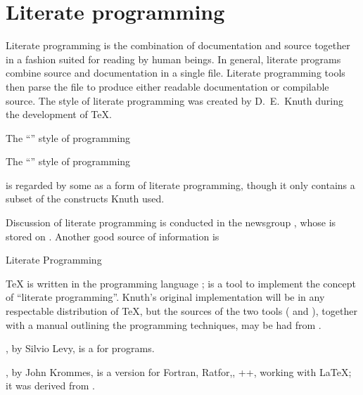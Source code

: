
\section{Literate programming}


Literate programming is the combination of documentation and source
together in a fashion suited for reading by human beings. 
In general, literate programs combine source
and documentation in a single file.  Literate programming tools then
parse the file to produce either readable documentation or compilable
source.  The  style of literate programming was created by
D.~E.~Knuth during the development of \TeX{}.

\htmlignore
The ``'' style of programming
\endhtmlignore
\begin{htmlversion}
  The ``'' style of programming
\end{htmlversion}
is regarded by some as a form of literate programming, though it only
contains a subset of the constructs Knuth used.

Discussion of literate programming is conducted in the newsgroup
, whose  is stored on
.  Another good source of information is
\begin{ctanrefs}
\item[\nothtml{\rmfamily}Literate Programming \acro{FAQ}]%
\end{ctanrefs}


\TeX{} is written in the programming language ; 
is a tool to implement the concept of ``literate programming''.
Knuth's original implementation will be in any respectable
distribution of \TeX{}, but the sources of the two tools
( and ), together with a manual
outlining the programming techniques, may be had from .

, by Silvio Levy, is a  for  programs.

, by John Krommes, is a version for Fortran,
Ratfor,, ++, working with \LaTeX{}; it was derived
from .

